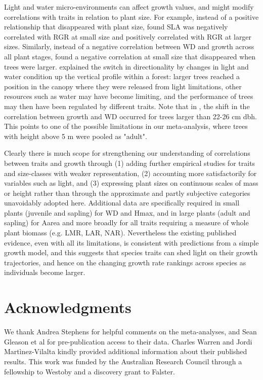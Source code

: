 \documentclass[a4paper]{article}\usepackage[]{graphicx}\usepackage[]{color}
\begin{document}
Light and water micro-environments can affect growth values, and might modify correlations with traits in relation to plant size. For example, instead of a positive relationship that disappeared with plant size, \citet{Iida:2014ep} found SLA was negatively correlated with RGR at small size and positively correlated with RGR at larger sizes. Similarly, instead of a negative correlation between WD and growth across all plant stages, \citep{Iida:2014ep,Iida:2014hq} found a negative correlation at small size that disappeared when trees were larger. \citet{Iida:2014hq} explained the switch in directionality by changes in light and water condition up the vertical profile within a forest: larger trees reached a position in the canopy where they were released from light limitations, other resources such as water may have become limiting, and the performance of trees may then have been regulated by different traits. Note that in \citet{Iida:2014hq}, the shift in the correlation between growth and WD occurred for trees larger than 22-26 cm dbh. This points to one of the possible limitations in our meta-analysis, where trees with height above 5 m were pooled as "adult". 

Clearly there is much scope for strengthening our understanding of correlations between traits and growth through (1) adding further empirical studies for traits and size-classes with weaker representation, (2) accounting more satisfactorily for variables such as light, and (3) expressing plant sizes on continuous scales of mass or height rather than through the approximate and partly subjective categories unavoidably adopted here. Additional data are specifically required in small plants (juvenile and sapling) for WD and Hmax, and in large plants (adult and sapling) for Aarea and more broadly for all traits requiring a measure of whole plant biomass (e.g. LMR, LAR, NAR). Nevertheless the existing published evidence, even with all its limitations, is consistent with predictions from a simple growth model, and this suggests that species traits can shed light on their growth trajectories, and hence on the changing growth rate rankings across species as individuals become larger. 

\section*{Acknowledgments}\label{Acknowledgment}

We thank Andrea Stephens for helpful comments on the meta-analyses, and Sean Gleason et al for pre-publication access to their data. Charles Warren and Jordi Martìnez-Vilalta kindly provided additional information about their published results. This work was funded by the Australian Research Council through a fellowship to Westoby and a discovery grant to Falster.  
\end{document}
